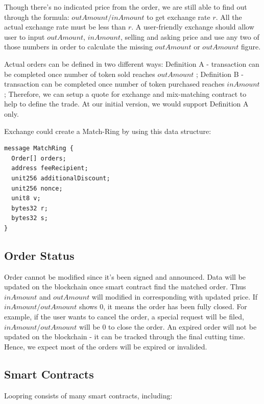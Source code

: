 \documentclass[UTF8,nofonts]{article}
\begin{document}
Though there's no indicated price from the order, we are still able to find out through the formula: $outAmount / inAmount$ to get exchange rate $r$. All the actual exchange rate must be less than $r$. A user-friendly exchange should allow user to input $outAmount$, $inAmount$,  selling and asking price and use any two of those numbers in order to calculate the missing $outAmount$ or $outAmount$ figure.

Actual orders can be defined in two different ways: Definition A - transaction can be completed once number of token sold reaches $outAmount$ ; Definition B - transaction can be completed once number of token purchased reaches $inAmount$; Therefore,  we can setup a quote for exchange and mix-matching contract to help to define the trade. At our initial version,  we would support Definition A only.

Exchange could create a Match-Ring by using this data structure:
\begin{verbatim}
message MatchRing {
  Order[] orders;
  address feeRecipient;
  unit256 additionalDiscount;
  unit256 nonce;
  unit8 v;
  bytes32 r;
  bytes32 s;
}
\end{verbatim}


\subsection{Order Status\label{sec: orderstate}}


Order cannot be modified since it's been signed and announced. Data will be updated on the blockchain once smart contract find the matched order. Thus $inAmount$ and $outAmount$ will modified in corresponding with updated price. If $inAmount / outAmount$ shows 0,  it means the order has been fully closed. For example,  if the user wants to cancel the order,  a special request will be filed,  $inAmount / outAmount$ will be 0 to close the order. An expired order will not be updated on the blockchain - it can be tracked through the final cutting time. Hence,  we expect most of the orders will be expired or invalided.

\subsection{Smart Contracts\label{sec: contracts}}

Loopring consists of many smart contracts,  including:
\end{document}
